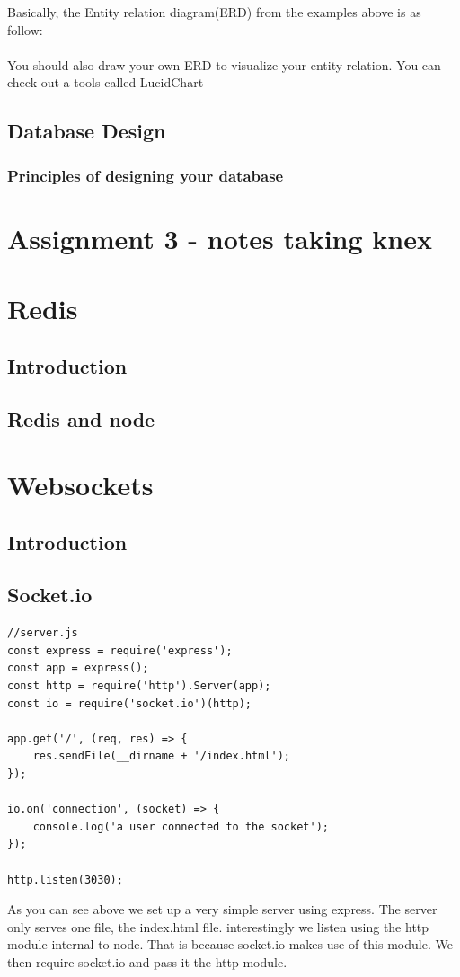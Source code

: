 \documentclass[a4paper]{article}
\begin{document}
Basically, the Entity relation diagram(ERD) from the examples above is as follow:\\
\\
You should also draw your own ERD to visualize your entity relation. You can check out a tools called LucidChart
\subsection{Database Design}
\subsubsection{Principles of designing your database}




\section{Assignment 3 - notes taking knex}

\section{Redis}
\subsection{Introduction}
\subsection{Redis and node}

\section{Websockets}
\subsection{Introduction}
\subsection{Socket.io}
\begin{lstlisting}
//server.js
const express = require('express');
const app = express();
const http = require('http').Server(app);
const io = require('socket.io')(http);

app.get('/', (req, res) => {
    res.sendFile(__dirname + '/index.html');
});

io.on('connection', (socket) => {
    console.log('a user connected to the socket');
});

http.listen(3030);
\end{lstlisting}
As you can see above we set up a very simple server using express. The server only serves one file, the index.html file. interestingly we listen using the http module internal to node. That is because socket.io makes use of this module. We then require socket.io and pass it the http module.\\
\end{document}
